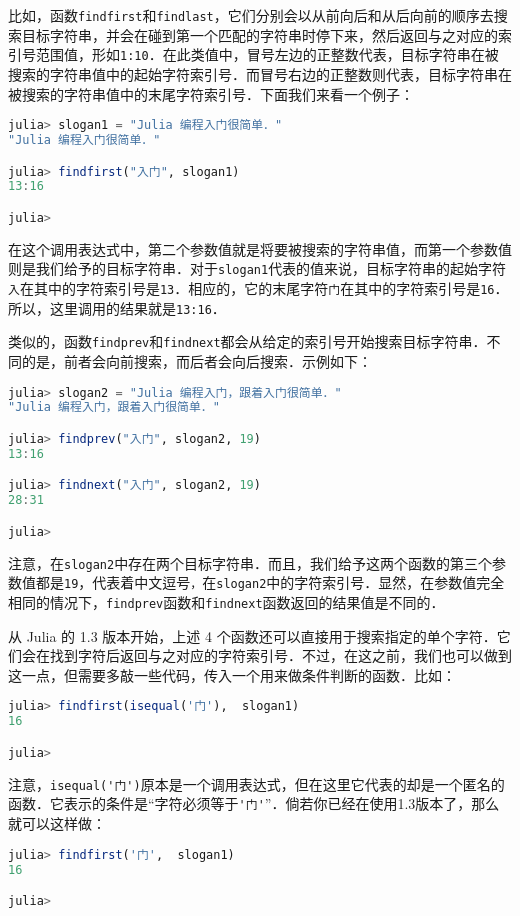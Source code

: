比如，函数\verb|findfirst|和\verb|findlast|，它们分别会以从前向后和从后向前的顺序去搜索目标字符串，并会在碰到第一个匹配的字符串时停下来，然后返回与之对应的索引号范围值，形如\verb|1:10|．在此类值中，冒号左边的正整数代表，目标字符串在被搜索的字符串值中的起始字符索引号．而冒号右边的正整数则代表，目标字符串在被搜索的字符串值中的末尾字符索引号．下面我们来看一个例子：
\begin{lstlisting}[language=julia]
julia> slogan1 = "Julia 编程入门很简单．"
"Julia 编程入门很简单．"

julia> findfirst("入门", slogan1)
13:16

julia> 
\end{lstlisting}

在这个调用表达式中，第二个参数值就是将要被搜索的字符串值，而第一个参数值则是我们给予的目标字符串．对于\verb|slogan1|代表的值来说，目标字符串的起始字符\verb|入|在其中的字符索引号是\verb|13|．相应的，它的末尾字符\verb|门|在其中的字符索引号是\verb|16|．所以，这里调用的结果就是\verb|13:16|．

类似的，函数\verb|findprev|和\verb|findnext|都会从给定的索引号开始搜索目标字符串．不同的是，前者会向前搜索，而后者会向后搜索．示例如下：
\begin{lstlisting}[language=julia]
julia> slogan2 = "Julia 编程入门，跟着入门很简单．"
"Julia 编程入门，跟着入门很简单．"

julia> findprev("入门", slogan2, 19)
13:16

julia> findnext("入门", slogan2, 19)
28:31

julia> 
\end{lstlisting}

注意，在\verb|slogan2|中存在两个目标字符串．而且，我们给予这两个函数的第三个参数值都是\verb|19|，代表着中文逗号\verb|，|在\verb|slogan2|中的字符索引号．显然，在参数值完全相同的情况下，\verb|findprev|函数和\verb|findnext|函数返回的结果值是不同的．

从 Julia 的 1.3 版本开始，上述 4 个函数还可以直接用于搜索指定的单个字符．它们会在找到字符后返回与之对应的字符索引号．不过，在这之前，我们也可以做到这一点，但需要多敲一些代码，传入一个用来做条件判断的函数．比如：
\begin{lstlisting}[language=julia]
julia> findfirst(isequal('门'),  slogan1) 
16

julia> 
\end{lstlisting}

注意，\verb|isequal('门')|原本是一个调用表达式，但在这里它代表的却是一个匿名的函数．它表示的条件是“字符必须等于\verb|'门'|”．倘若你已经在使用1.3版本了，那么就可以这样做：
\begin{lstlisting}[language=julia]
julia> findfirst('门',  slogan1)
16

julia> 
\end{lstlisting}

